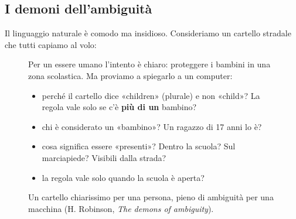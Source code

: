 \subsection{I demoni dell'ambiguità}

Il linguaggio naturale è comodo ma insidioso. Consideriamo un cartello stradale che tutti capiamo al volo:

\begin{figure}[H]
\centering
\begin{minipage}[c]{0.24\textwidth}
\centering
{}
\end{minipage}\hfill
\begin{minipage}[c]{0.72\textwidth}
Per un essere umano l'intento è chiaro: proteggere i bambini in una zona scolastica. Ma proviamo a spiegarlo a un computer:
\begin{itemize}
  \item perché il cartello dice «children» (plurale) e non «child»? La regola vale solo se c'è \textbf{più di un} bambino?
  \item chi è considerato un «bambino»? Un ragazzo di 17 anni lo è?
  \item cosa significa essere «presenti»? Dentro la scuola? Sul marciapiede? Visibili dalla strada?
  \item la regola vale solo quando la scuola è aperta?
\end{itemize}
\end{minipage}
\caption{Un cartello chiarissimo per una persona, pieno di ambiguità per una macchina (H. Robinson, \textit{The demons of ambiguity}).}
\end{figure}

